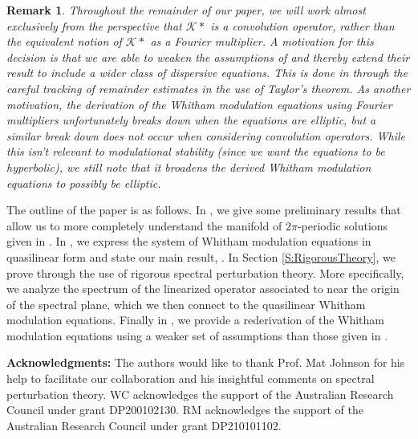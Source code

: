 \documentclass[11pt,leqno]{article}
\numberwithin{equation}{section}
\newtheorem{remark}[theorem]{Remark}
\theoremstyle{definition}
\begin{document}
\begin{remark}
    Throughout the remainder of our paper, we will work almost exclusively from the perspective that $\mathcal{K}*$ is a convolution operator, rather than the equivalent notion of $\mathcal{K}*$ as a Fourier multiplier.  A motivation for this decision is that we are able to weaken the assumptions of \cite{BIHS2021} and thereby extend their result to include a wider class of dispersive equations.  This is done in  through the careful tracking of remainder estimates in the use of Taylor's theorem.  As another motivation, the derivation of the Whitham modulation equations using Fourier multipliers unfortunately breaks down when the equations are elliptic, but a similar break down does not occur when considering convolution operators.  While this isn't relevant to modulational stability (since we want the equations to be hyperbolic), we still note that it broadens the derived Whitham modulation equations to possibly be elliptic.  
\end{remark}
\medskip

The outline of the paper is as follows.  In , we give some preliminary  results that allow us to more completely understand the manifold of $2\pi$-periodic solutions given in .  In , we express the system of Whitham modulation equations in quasilinear form and state our main result, .  In Section \ref{S:RigorousTheory}, we prove  through the use of rigorous spectral perturbation theory.  More specifically, we analyze the spectrum of the linearized operator associated to  near the origin of the spectral plane, which we then connect to the quasilinear Whitham modulation equations.  Finally in  , we provide a rederivation of the Whitham modulation equations using a weaker set of assumptions than those given in \cite{BIHS2021}.
\medskip

\noindent
{\bf Acknowledgments:} The authors would like to thank Prof. Mat Johnson for his help to facilitate our collaboration and his insightful comments on spectral perturbation theory. WC acknowledges the support of the Australian Research Council under grant DP200102130. RM acknowledges the support of the Australian Research Council under grant DP210101102.



\end{document}
